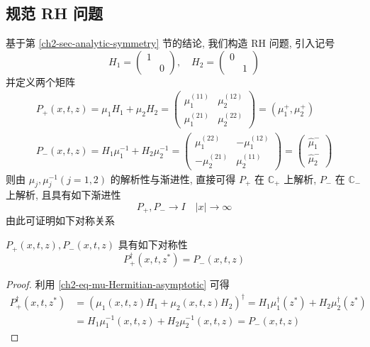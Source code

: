 \subsection{规范 RH 问题}
基于第 \ref{ch2-sec-analytic-symmetry} 节的结论, 我们构造 RH 问题, 引入记号
\begin{equation}
    H_{1} = \begin{pmatrix}
        1 & \\ & 0
    \end{pmatrix}, \quad
    H_{2} = \begin{pmatrix}
        0 & \\ & 1
    \end{pmatrix}
\end{equation}
并定义两个矩阵
\begin{equation}
    \begin{aligned}
        P_{+}(x,t,z) = \mu_{1} H_{1} + \mu_{2} H_{2} = \begin{pmatrix}  \mu_{1}^{(11)} & \mu_{2}^{(12)} \\ \mu_{1}^{(21)} & \mu_{2}^{(22)} \end{pmatrix} = (\mu_{1}^{+}, \mu_{2}^{+}) \\
        P_{-}(x,t,z) =  H_{1} \mu_{1}^{-1} +  H_{2}\mu_{2}^{-1} = \begin{pmatrix}  \mu_{1}^{(22)} & -\mu_{1}^{(12)} \\ -\mu_{2}^{(21)} & \mu_{2}^{(11)} \end{pmatrix} = \begin{pmatrix} \hat{\mu}_{1}^{-} \\ \hat{\mu}_{2}^{-} \end{pmatrix}
    \end{aligned}
\end{equation}
则由 $ \mu_{j}, \mu_{j}^{-1} (j=1,2) $ 的解析性与渐进性, 直接可得 $ P_{+} $ 在 $ \mathbb{C}_{+} $ 上解析, $ P_{-} $ 在 $ \mathbb{C}_{-} $ 上解析, 且具有如下渐进性
\begin{equation}
    P_{+}, P_{-} \to I \quad | x | \to \infty
\end{equation}
由此可证明如下对称关系
\begin{theorem}
    $ P_{+}(x,t,z), P_{-}(x,t,z) $ 具有如下对称性
    \begin{equation}
        P_{+}^{\dagger}(x,t,z^{*}) =  P_{-}(x,t,z) \label{ch2-eq-P-symmetry}
    \end{equation}
\end{theorem}
\begin{proof}
    利用 \eqref{ch2-eq-mu-Hermitian-asymptotic} 可得
    \begin{equation}
        \begin{aligned}
            P_{+}^{\dagger}(x,t,z^{*}) & = (\mu_{1}(x,t,z) H_{1} + \mu_{2}(x,t,z) H_{2} )^{\dagger} = H_{1} \mu_{1}^{\dagger}(z^{*}) + H_{2}\mu_{2}^{\dagger}(z^{*}) \\
                                       & = H_{1}\mu_{1}^{-1}(x,t,z) + H_{2} \mu_{2}^{-1}(x,t,z) = P_{-}(x,t,z)
        \end{aligned}
    \end{equation}
\end{proof}

